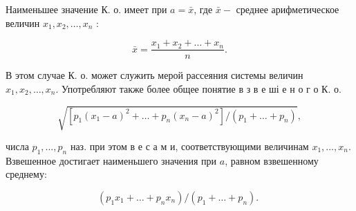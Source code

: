 \documentclass[10pt]{article}
\begin{document}
Наименьшее значение К. о. имеет при $a=\bar{x}$, где $\bar{x}-$ среднее арифметическое величин $x_{1}, x_{2}, \ldots, x_{n}$ :



\[

\bar{x}=\frac{x_{1}+x_{2}+\ldots+x_{n}}{n} .

\]



В этом случае К. о. может служить мерой рассеяния системы величин $x_{1}, x_{2}, \ldots, x_{n}$. Употребляют также более общее понятие в з в е ші е н о г о К. $о$.



\[

\sqrt{\left[p_{1}\left(x_{1}-a\right)^{2}+\ldots+p_{n}\left(x_{n}-a\right)^{2}\right] /\left(p_{1}+\ldots+p_{n}\right)},

\]



числа $p_{1}, \ldots, p_{n}$ наз. при этом в е с а м и, соответствующими величинам $x_{1}, \ldots, x_{n}$. Взвешенное достигает наименьшего значения при $a$, равном взвешенному среднему:



\[

\left(p_{1} x_{1}+\ldots+p_{n} x_{n}\right) /\left(p_{1}+\ldots+p_{n}\right) \text {. }

\]
\end{document}
